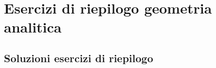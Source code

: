 %	
\chapter{Esercizi di riepilogo geometria analitica}
\tcbstartrecording






\tcbstoprecording
\newpage
\section{Soluzioni esercizi di riepilogo}
\tcbinputrecords							